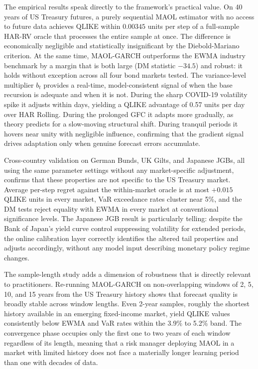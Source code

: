 The empirical results speak directly to the framework's practical value. On 40 years of US Treasury futures, a purely sequential MAOL estimator with no access to future data achieves QLIKE within $0.00345$ units per step of a full-sample HAR-RV oracle that processes the entire sample at once. The difference is economically negligible and statistically insignificant by the Diebold-Mariano criterion. At the same time, MAOL-GARCH outperforms the EWMA industry benchmark by a margin that is both large (DM statistic $-34.5$) and robust: it holds without exception across all four bond markets tested. The variance-level multiplier $b_t$ provides a real-time, model-consistent signal of when the base recursion is adequate and when it is not. During the sharp COVID-19 volatility spike it adjusts within days, yielding a QLIKE advantage of 0.57 units per day over HAR Rolling. During the prolonged GFC it adapts more gradually, as theory predicts for a slow-moving structural shift. During tranquil periods it hovers near unity with negligible influence, confirming that the gradient signal drives adaptation only when genuine forecast errors accumulate.

Cross-country validation on German Bunds, UK Gilts, and Japanese JGBs, all using the same parameter settings without any market-specific adjustment, confirms that these properties are not specific to the US Treasury market. Average per-step regret against the within-market oracle is at most $+0.015$ QLIKE units in every market, VaR exceedance rates cluster near 5\%, and the DM tests reject equality with EWMA in every market at conventional significance levels. The Japanese JGB result is particularly telling: despite the Bank of Japan's yield curve control suppressing volatility for extended periods, the online calibration layer correctly identifies the altered tail properties and adjusts accordingly, without any model input describing monetary policy regime changes.

The sample-length study adds a dimension of robustness that is directly relevant to practitioners. Re-running MAOL-GARCH on non-overlapping windows of 2, 5, 10, and 15 years from the US Treasury history shows that forecast quality is broadly stable across window lengths. Even 2-year samples, roughly the shortest history available in an emerging fixed-income market, yield QLIKE values consistently below EWMA and VaR rates within the 3.9\% to 5.2\% band. The convergence phase occupies only the first one to two years of each window regardless of its length, meaning that a risk manager deploying MAOL in a market with limited history does not face a materially longer learning period than one with decades of data.

